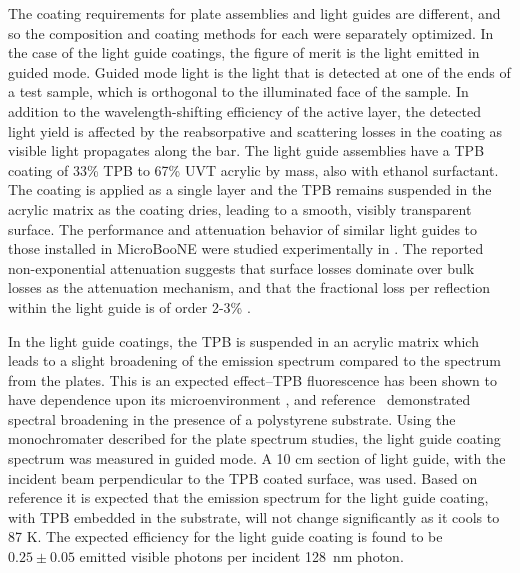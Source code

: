 The coating requirements for plate assemblies and light guides are different, and so the composition and coating methods for each were separately optimized.    In the case of the light guide coatings, the figure of merit is the light emitted in guided mode.  Guided mode light is the light that is detected at one of the ends of a test sample, which is orthogonal to the illuminated face of the sample.  In addition to the wavelength-shifting efficiency of the active layer, the detected light yield is affected by the reabsorpative and scattering losses in the coating as visible light propagates along the bar. The light guide assemblies have a TPB coating of 33\% TPB to 67\% UVT acrylic by mass, also with ethanol surfactant. The coating is applied as a single layer and the TPB remains suspended in the acrylic matrix as the coating dries, leading to a smooth, visibly transparent surface.  The performance and attenuation behavior of similar light guides to those installed in MicroBooNE were studied experimentally in \cite{Baptista:2012}.  The reported non-exponential attenuation suggests that surface losses dominate over bulk losses as the attenuation mechanism, and that the fractional loss per reflection within the light guide is of order 2-3\% \cite{Jones:2013}. 

In the light guide coatings, the TPB is suspended in an acrylic matrix which leads to a slight broadening of the emission spectrum compared to the spectrum from the plates. This is an expected effect--TPB fluorescence has been shown to have dependence upon its microenvironment \cite{Birks:1959,Birks:1961,Francini:2013-jinst,Hanagodimath:2008, Liu:1997}, and reference~\cite{Francini:2013-jinst} demonstrated spectral broadening in the presence of a polystyrene substrate.  Using the monochromater described for the plate spectrum studies, the light guide coating spectrum was measured in guided mode. A 10 cm section of light guide, with the incident beam perpendicular to the TPB coated surface, was used.  Based on reference \cite{Francini:2013-jinst} it is expected that the emission spectrum for the light guide coating, with TPB embedded in the substrate, will not change significantly as it cools to 87 K.  The expected efficiency for the light guide coating is found to be $0.25 \pm 0.05$ emitted visible photons per incident 128~nm photon.


